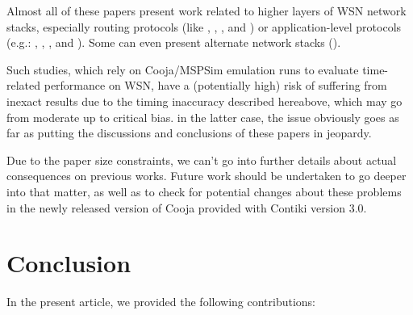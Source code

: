 \documentclass[10pt,emptycopyrightspace]{ewsn-proc}
\begin{document}
\smallskip

Almost all of these papers present work related to higher layers of
WSN network stacks, especially routing protocols (like
\cite{Constrain-Routing-Trees-2014},
\cite{Co-RPL-2014}, \cite{IETF-Routing-WSN-2014},
and \cite{Trickle-L2-2014})
or application-level protocols (e.g.: \cite{DINAS-2014},
\cite{Efficient-Distrib-Svc-Discovery-2014},
\cite{Visual-Sensor-Networks-2014}, and \cite{Key-Mgmt-2015}).
Some can even present alternate network stacks (\cite{TinySDN-2014}).

\bigskip

Such studies, which rely on Cooja/MSPSim emulation runs to evaluate
time-related performance on WSN, have a (potentially high) risk of
suffering from inexact results due to the timing inaccuracy described
hereabove, which may go from moderate up to critical bias.
in the latter case, the issue obviously goes as far as putting
the discussions and conclusions of these papers in jeopardy.

Due to the paper size constraints, we can't go into further details about
actual consequences on previous works. Future work should be undertaken to
go deeper into that matter, as well as to check for potential changes about
these problems in the newly released version of Cooja provided with Contiki
version 3.0.

\medskip


\section{Conclusion}
\label{conclusion}

In the present article, we provided the following contributions:
\end{document}
